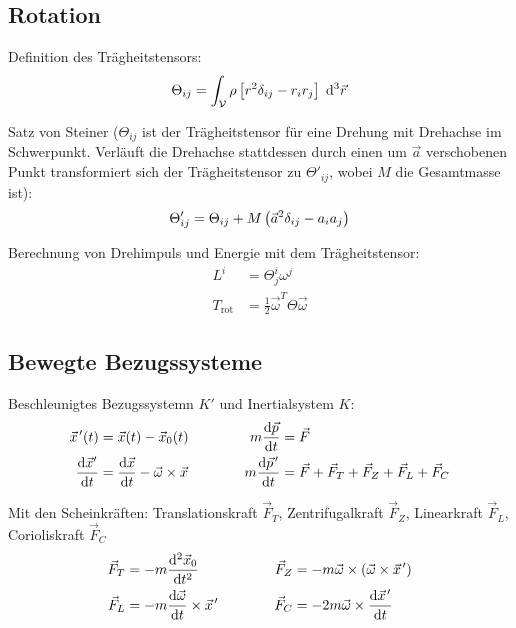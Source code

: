 \documentclass[11pt]{article}
\numberwithin{equation}{section}
\begin{document}
		\subsection{Rotation}
			\noindent
			Definition des Trägheitstensors:
			\begin{equation}
				\Theta_{ij}=\int_{\mathcal{V}} \rho \left[r^2\delta_{ij}-r_i r_j\right] \;\mathrm{d}^3\vec{r}
			\end{equation}

			\noindent
			Satz von Steiner ($\Theta_{ij}$ ist der Trägheitstensor für eine Drehung mit Drehachse im Schwerpunkt. Verläuft die Drehachse stattdessen durch einen um $\vec{a}$ verschobenen Punkt transformiert sich der Trägheitstensor zu $\Theta'_{ij}$, wobei $M$ die Gesamtmasse ist):
			\begin{equation}
				\Theta'_{ij} = \Theta_{ij} + M\left( \vec{a}^2\delta_{ij} - a_i a_j \right)
			\end{equation}

			\noindent
			Berechnung von Drehimpuls und Energie mit dem	Trägheitstensor:
			\begin{equation}
				\begin{aligned}
					L^i &= \Theta^i_j \omega^j \\
					T_{\mathrm{rot}} &= \frac{1}{2}\vec{\omega}^T \Theta \vec{\omega}
				\end{aligned}
			\end{equation}

		\subsection{Bewegte Bezugssysteme}
			\noindent
			Beschleunigtes Bezugssystemn $K'$ und Inertialsystem $K$:
			\begin{equation}
				\begin{aligned}
					\pvec{x}'(t) &= \vec{x}(t)-\vec{x}_0(t) &\hspace{30pt}
					m\tder{\vec{p}}{t} &= \vec{F} \\
					\tder{\vec{x}'}{t} &= \tder{\vec{x}}{t}-\vec{\omega}\times\vec{x} &\hspace{30pt}
					m\tder{\pvec{p}'}{t} &= \vec{F} + \vec{F}_T + \vec{F}_Z + \vec{F}_L + \vec{F}_C \\
				\end{aligned}
			\end{equation}

			\noindent
			Mit den Scheinkräften: Translationskraft $\vec{F}_T$, Zentrifugalkraft $\vec{F}_Z$, Linearkraft $\vec{F}_L$, Corioliskraft $\vec{F}_C$
			\begin{equation}
				\begin{aligned}
					\vec{F}_T &= -m\frac{\diff^2 \vec{x}_0}{\diff t^2} &\hspace{30pt}
					\vec{F}_Z &= -m\vec{\omega}\times\Br{\vec{\omega}\times\pvec{x}'} \\
					\vec{F}_L &= -m\tder{\vec{\omega}}{t}\times\pvec{x}' &\hspace{30pt}
					\vec{F}_C &= -2m\vec{\omega}\times\tder{\pvec{x}'}{t} \\
				\end{aligned}
			\end{equation}
\end{document}
